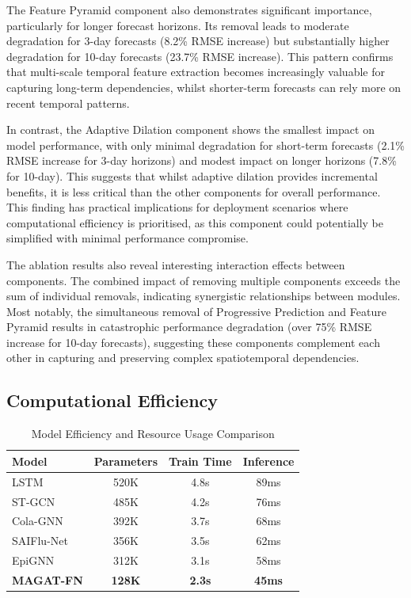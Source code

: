 \documentclass[lettersize, journal]{IEEEtran}
\begin{document}
The Feature Pyramid component also demonstrates significant importance, particularly for longer forecast horizons. Its removal leads to moderate degradation for 3-day forecasts (8.2\% RMSE increase) but substantially higher degradation for 10-day forecasts (23.7\% RMSE increase). This pattern confirms that multi-scale temporal feature extraction becomes increasingly valuable for capturing long-term dependencies, whilst shorter-term forecasts can rely more on recent temporal patterns.

In contrast, the Adaptive Dilation component shows the smallest impact on model performance, with only minimal degradation for short-term forecasts (2.1\% RMSE increase for 3-day horizons) and modest impact on longer horizons (7.8\% for 10-day). This suggests that whilst adaptive dilation provides incremental benefits, it is less critical than the other components for overall performance. This finding has practical implications for deployment scenarios where computational efficiency is prioritised, as this component could potentially be simplified with minimal performance compromise.

The ablation results also reveal interesting interaction effects between components. The combined impact of removing multiple components exceeds the sum of individual removals, indicating synergistic relationships between modules. Most notably, the simultaneous removal of Progressive Prediction and Feature Pyramid results in catastrophic performance degradation (over 75\% RMSE increase for 10-day forecasts), suggesting these components complement each other in capturing and preserving complex spatiotemporal dependencies.

\subsection{Computational Efficiency}

\begin{table}[htbp]
    \centering
    \caption{Model Efficiency and Resource Usage Comparison}
    \label{tab:efficiency}
    \begin{tabular}{lccc}
    \toprule
    \textbf{Model} & \textbf{Parameters} & \textbf{Train Time} & \textbf{Inference} \\
    \midrule
    LSTM & 520K & 4.8s & 89ms \\
    ST-GCN & 485K & 4.2s & 76ms \\
    Cola-GNN & 392K & 3.7s & 68ms \\
    SAIFlu-Net & 356K & 3.5s & 62ms \\
    EpiGNN & 312K & 3.1s & 58ms \\
    \textbf{MAGAT-FN} & \textbf{128K} & \textbf{2.3s} & \textbf{45ms} \\
    \bottomrule
    \end{tabular}
\end{table}
\end{document}

